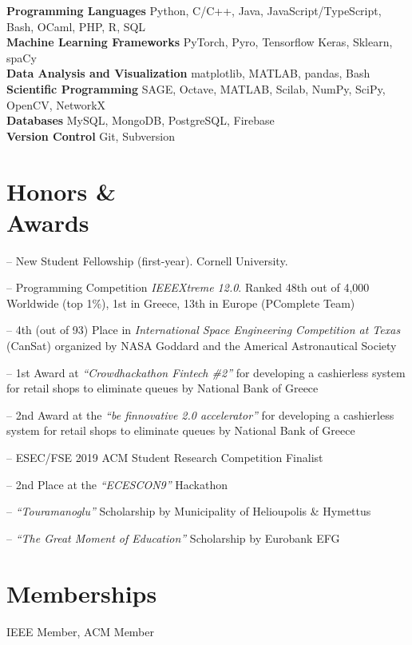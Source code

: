 \documentclass[margin, 10pt]{res}
\newcommand{\field}[2]{\noindent \textbf{#1} \hfill #2 \\}
\begin{document}
\begin{resume}
\field{Programming Languages}  {Python, C/C++, Java, JavaScript/TypeScript, Bash, OCaml, PHP, R, SQL  } 
\field{Machine Learning Frameworks}  {PyTorch, Pyro, Tensorflow Keras, Sklearn, spaCy } 
\field{Data Analysis and Visualization} {matplotlib, MATLAB, pandas, Bash } 
\field{Scientific Programming} {SAGE, Octave, MATLAB, Scilab, NumPy, SciPy, OpenCV, NetworkX} 
\field{Databases} {MySQL, MongoDB, PostgreSQL, Firebase}
\field{Version Control} {Git, Subversion}
\section{Honors \& \\ Awards} 
\begin{compactitem}
	\item[--] New Student Fellowship (first-year). Cornell University. 
    \item[--] Programming Competition \emph{IEEEXtreme 12.0}. Ranked 48th out of 4,000 Worldwide (top 1\%), 1st in Greece, 13th in Europe (PComplete Team)
    \item[--] 4th (out of 93) Place in \emph{International Space Engineering  Competition at Texas} (CanSat) organized by NASA Goddard and the Americal Astronautical Society
    \item[--] 1st Award at \emph{``Crowdhackathon Fintech \#2''} for developing a cashierless system for retail shops to eliminate queues by National Bank of Greece
    \item[--] 2nd Award at the \emph{``be finnovative 2.0 accelerator''} for developing a cashierless system for retail shops to eliminate queues by National Bank of Greece
    \item[--] ESEC/FSE 2019 ACM Student Research Competition Finalist
    \item[--] 2nd Place at the \emph{``ECESCON9''} Hackathon 
    \item [--] \emph{``Touramanoglu''} Scholarship by Municipality of Helioupolis \& Hymettus
    \item [--] \emph{``The Great Moment of Education''} Scholarship by Eurobank EFG 

\end{compactitem}


\section{Memberships} IEEE Member, ACM Member


\end{resume}
\end{document}

